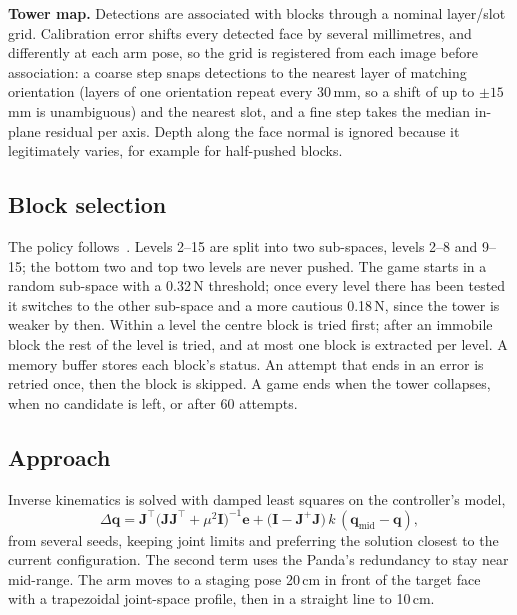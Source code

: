 \documentclass[conference]{IEEEtran}
\newcommand{\vect}[1]{\mathbf{#1}}
\begin{document}
\textbf{Tower map.} Detections are associated with blocks through a nominal
layer/slot grid. Calibration error shifts every detected face by several millimetres,
and differently at each arm pose, so the grid is registered from each image before
association: a coarse step snaps detections to the nearest layer of matching
orientation (layers of one orientation repeat every 30\,mm, so a shift of up to
$\pm15$\,mm is unambiguous) and the nearest slot, and a fine step takes the median
in-plane residual per axis. Depth along the face normal is ignored because it
legitimately varies, for example for half-pushed blocks.

\subsection{Block selection}

The policy follows~\cite{marchionna2023}. Levels 2--15 are split into two sub-spaces,
levels 2--8 and 9--15; the bottom two and top two levels are never pushed. The game
starts in a random sub-space with a 0.32\,N threshold; once every level there has been
tested it switches to the other sub-space and a more cautious 0.18\,N, since the tower
is weaker by then. Within a level the centre block is tried first; after an immobile
block the rest of the level is tried, and at most one block is extracted per level.
A memory buffer stores each block's status. An attempt that ends in an error is
retried once, then the block is skipped. A game ends when the tower collapses, when
no candidate is left, or after 60 attempts.

\subsection{Approach}

Inverse kinematics is solved with damped least squares on the controller's model,
\begin{equation}
\Delta\vect{q} = \vect{J}^{\top}\big(\vect{J}\vect{J}^{\top}+\mu^{2}\vect{I}\big)^{-1}\vect{e}
 + \big(\vect{I}-\vect{J}^{+}\vect{J}\big)\,k\,(\vect{q}_{\text{mid}}-\vect{q}),
\end{equation}
from several seeds, keeping joint limits and preferring the solution closest to the
current configuration. The second term uses the Panda's redundancy to stay near
mid-range. The arm moves to a staging pose 20\,cm in front of the target face with a
trapezoidal joint-space profile, then in a straight line to 10\,cm.
\end{document}
